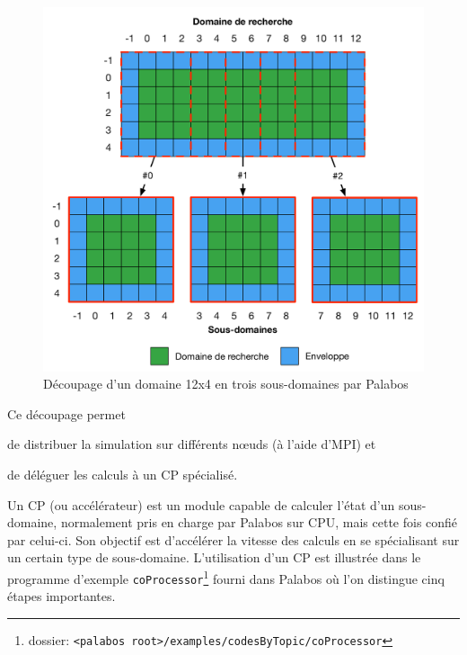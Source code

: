 \begin{figure}[h]
	\centering
	\includegraphics[scale=0.65, fbox]{images/decoupage_domaine_palabos.pdf}
	\caption{Découpage d'un domaine 12x4 en trois sous-domaines par Palabos}
	\label{fig:plb_domain_split}
\end{figure}

Ce découpage permet
\begin{enumerate*}
\item de distribuer la simulation sur différents nœuds (à l'aide d'\acs{MPI}) et
\item de déléguer les calculs à un \ac{CP} spécialisé.
\end{enumerate*}

Un \ac{CP} (ou accélérateur) est un module capable de calculer l'état d'un sous-domaine, normalement pris en charge par Palabos sur \acs{CPU}, mais cette fois confié par celui-ci. Son objectif est d'accélérer la vitesse des calculs en se spécialisant sur un certain type de sous-domaine. L'utilisation d'un \ac{CP} est illustrée dans le programme d'exemple \texttt{coProcessor}\footnote{dossier: \texttt{<palabos root>/examples/codesByTopic/coProcessor}} fourni dans Palabos où l'on distingue cinq étapes importantes.

